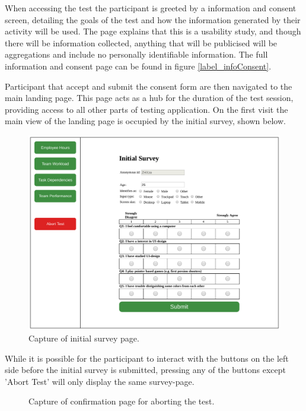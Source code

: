 {  When accessing the test the participant is greeted by a information and
  consent screen, detailing the goals of the test and how the information
  generated by their activity will be used. The page explains that this
  is a usability study, and though there will be information collected,
  anything that will be publicised will be aggregations and include no
  personally identifiable information. The full information and consent
  page can be found in figure \ref{label_infoConsent}.

  Participant that accept and submit the consent form are then navigated
  to the main landing page. This page acts as a hub for the duration of
  the test session, providing access to all other parts of testing
  application. On the first visit the main view of the landing page is
  occupied by the initial survey, shown below.

  \begin{figure}[h!]
    \centering
    \includegraphics[width=.7\textwidth]{figures/captures/webapp_pre_survey.pdf}
    \caption{Capture of initial survey page.}
    \label{label_preSurvey}
  \end{figure}

  While it is possible for the participant to interact with the buttons on
  the left side before the initial survey is submitted, pressing any of the
  buttons except 'Abort Test' will only display the same survey-page.

  \begin{figure}[h!]
    \centering
    \caption{Capture of confirmation page for aborting the test.}
    \label{label_abort}
  \end{figure}

}
